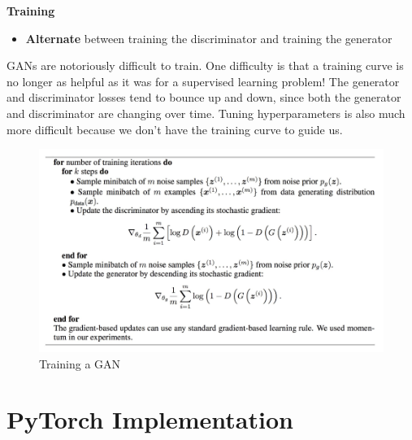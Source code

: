 \textbf{Training}
\begin{itemize}
    \item \textbf{Alternate} between training the discriminator and training the generator
\end{itemize}

\begin{idea}
    GANs are notoriously difficult to train. One difficulty is that a training curve is no longer as helpful as it was for a supervised learning problem! The generator and discriminator losses tend to bounce up and down, since both the generator and discriminator are changing over time. Tuning hyperparameters is also much more difficult because we don't have the training curve to guide us.
\end{idea}

\begin{figure}[h!t]
    \centering
    \includegraphics[width=1\linewidth]{traininggnn.png}
    \caption{Training a GAN}
    \label{fig:enter-label}
\end{figure}

\section{PyTorch Implementation}

